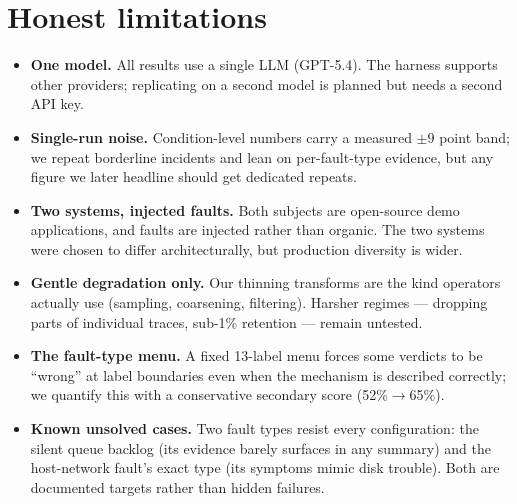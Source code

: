 \section{Honest limitations}
\label{sec:limitations}

\begin{itemize}
  \item \textbf{One model.} All results use a single LLM (GPT-5.4). The harness
  supports other providers; replicating on a second model is planned but needs a
  second API key.
  \item \textbf{Single-run noise.} Condition-level numbers carry a measured $\pm 9$
  point band; we repeat borderline incidents and lean on per-fault-type evidence,
  but any figure we later headline should get dedicated repeats.
  \item \textbf{Two systems, injected faults.} Both subjects are open-source demo
  applications, and faults are injected rather than organic. The two systems were
  chosen to differ architecturally, but production diversity is wider.
  \item \textbf{Gentle degradation only.} Our thinning transforms are the kind
  operators actually use (sampling, coarsening, filtering). Harsher regimes ---
  dropping parts of individual traces, sub-1\% retention --- remain untested.
  \item \textbf{The fault-type menu.} A fixed 13-label menu forces some verdicts to
  be ``wrong'' at label boundaries even when the mechanism is described correctly;
  we quantify this with a conservative secondary score (52\%$\to$65\%).
  \item \textbf{Known unsolved cases.} Two fault types resist every configuration:
  the silent queue backlog (its evidence barely surfaces in any summary) and the
  host-network fault's exact type (its symptoms mimic disk trouble). Both are
  documented targets rather than hidden failures.
\end{itemize}
